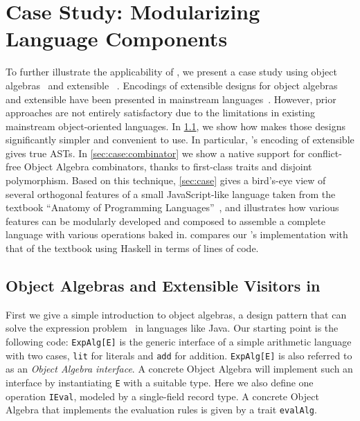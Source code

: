 
\chapter{Case Study: Modularizing Language Components}
\label{chap:case_study}

To further illustrate the applicability of \sedel, we present a case study using
object algebras~\citep{oliveira2012extensibility} and extensible
\visitor~\citep{oliveira09modular, togersen:2004}. Encodings of extensible
designs for object algebras and extensible \visitor have been presented in
mainstream languages~\citep{oliveira09modular, togersen:2004,
  oliveira2012extensibility, oliveira2013feature, rendel14attributes}. However,
prior approaches are not entirely satisfactory due to the limitations in
existing mainstream object-oriented languages. In \cref{sec:ob}, we show how
\sedel makes those designs significantly simpler and convenient to use. In
particular, \sedel's encoding of extensible \visitor gives true ASTs. In
\cref{sec:case:combinator} we show a native support for conflict-free Object
Algebra combinators, thanks to first-class traits and disjoint polymorphism.
Based on this technique, \cref{sec:case} gives a bird's-eye view of several
orthogonal features of a small JavaScript-like language taken from the textbook
``Anatomy of Programming Languages''~\citep{poplcook}, and illustrates how
various features can be modularly developed and composed to assemble a complete
language with various operations baked in.  compares our
\sedel's implementation with that of the textbook using Haskell in terms of
lines of code.


\section{Object Algebras and Extensible Visitors in \sedel}
\label{sec:ob}

First we give a simple introduction to object algebras, a design pattern that
can solve the expression problem~\citep{wadler1998expression, cook1990object, krishnamurthi1998synthesizing} in languages like
Java. Our starting point is the following code:
\lstinline{ExpAlg[E]} is the generic interface of a simple arithmetic language
with two cases, \lstinline{lit} for literals and \lstinline{add} for addition.
\lstinline{ExpAlg[E]} is also referred to as an \emph{Object Algebra interface}. A concrete
Object Algebra will implement such an interface by instantiating \lstinline{E}
with a suitable type. Here we also define one operation \lstinline{IEval},
modeled by a single-field record type. A concrete Object Algebra that
implements the evaluation rules is given by a trait
\lstinline{evalAlg}.

